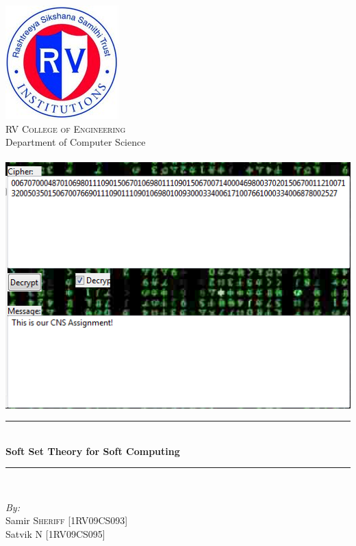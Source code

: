 \documentclass[12pt]{article} %
\title{}
\newcommand{\HRule}{\rule{\linewidth}{0.5mm}}
\begin{document}
\maketitle
\begin{titlepage}

\begin{center}


\includegraphics[scale=0.75]{RVCE.png}\\[1cm]    

\textsc{\LARGE  RV College of Engineering}\\[0.5cm]
\large{Department of Computer Science}\\[1cm]
\textsc{\Large }\\[0.5cm]

\includegraphics[scale=1]{proj.png}\\[1cm]    

\HRule \\[0.4cm]
{  \huge\bfseries Soft Set Theory for Soft Computing }\\[0.4cm]

\HRule \\[1cm]

\begin{minipage}{0.8\textwidth}
\begin{flushleft} \large
\emph{By:}\\
Samir \textsc{Sheriff} [1RV09CS093]\\
Satvik \textsc{N} [1RV09CS095]\\



\end{flushleft}
\end{minipage}
\end{center}
\end{titlepage}
\end{document}
